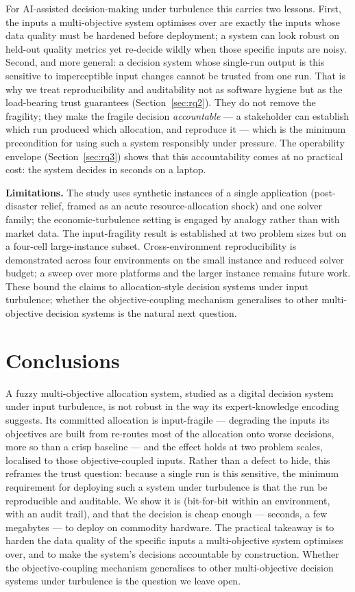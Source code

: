 \documentclass[systems,article,submit,moreauthors,pdftex]{Definitions/mdpi}
\begin{document}
For AI-assisted decision-making under turbulence this carries two lessons. First, the inputs a
multi-objective system optimises over are exactly the inputs whose data quality must be
hardened before deployment; a system can look robust on held-out quality metrics yet re-decide
wildly when those specific inputs are noisy. Second, and more general: a decision system whose
single-run output is this sensitive to imperceptible input changes cannot be trusted from one
run. That is why we treat reproducibility and auditability not as software hygiene but as the
load-bearing trust guarantees (Section~\ref{sec:rq2}). They do not remove the fragility; they
make the fragile decision \emph{accountable} --- a stakeholder can establish which run produced
which allocation, and reproduce it --- which is the minimum precondition for using such a
system responsibly under pressure. The operability envelope (Section~\ref{sec:rq3}) shows that
this accountability comes at no practical cost: the system decides in seconds on a laptop.

\textbf{Limitations.} The study uses synthetic instances of a single application (post-disaster
relief, framed as an acute resource-allocation shock) and one solver family; the
economic-turbulence setting is engaged by analogy rather than with market data. The
input-fragility result is established at two problem sizes but on a four-cell large-instance
subset. Cross-environment reproducibility is demonstrated across four environments on the small
instance and reduced solver budget; a sweep over more platforms and the larger instance remains
future work. These bound the claims to
allocation-style decision systems under input turbulence; whether the objective-coupling
mechanism generalises to other multi-objective decision systems is the natural next question.

\section{Conclusions}\label{sec:conclusion}

A fuzzy multi-objective allocation system, studied as a digital decision system under input
turbulence, is not robust in the way its expert-knowledge encoding suggests. Its committed
allocation is input-fragile --- degrading the inputs its objectives are built from re-routes
most of the allocation onto worse decisions, more so than a crisp baseline --- and the effect
holds at two problem scales, localised to those objective-coupled inputs. Rather than a defect
to hide, this reframes the trust question: because a single run is this sensitive, the
minimum requirement for deploying such a system under turbulence is that the run be
reproducible and auditable. We show it is (bit-for-bit within an environment, with an
audit trail), and that the decision is cheap enough --- seconds, a few megabytes --- to deploy
on commodity hardware. The practical takeaway is to harden the data quality of the specific
inputs a multi-objective system optimises over, and to make the system's decisions accountable
by construction. Whether the objective-coupling mechanism generalises to other multi-objective
decision systems under turbulence is the question we leave open.
\end{document}
